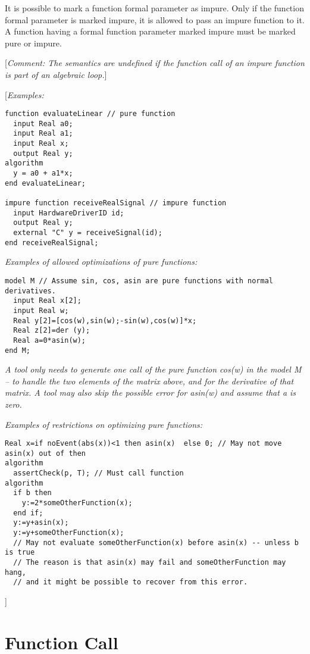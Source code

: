 It is possible to mark a function formal parameter as impure. Only if
the function formal parameter is marked impure, it is allowed to pass an
impure function to it. A function having a formal function parameter
marked impure must be marked pure or impure.

{[}\emph{Comment: The semantics are undefined if the function call of an
impure function is part of an algebraic loop.}{]}

{[}\emph{Examples:}

\begin{lstlisting}[language=modelica]
function evaluateLinear // pure function
  input Real a0;
  input Real a1;
  input Real x;
  output Real y;
algorithm
  y = a0 + a1*x;
end evaluateLinear;

impure function receiveRealSignal // impure function
  input HardwareDriverID id;
  output Real y;
  external "C" y = receiveSignal(id);
end receiveRealSignal;
\end{lstlisting}
\emph{Examples of allowed optimizations of pure functions:}

\begin{lstlisting}[language=modelica]
model M // Assume sin, cos, asin are pure functions with normal derivatives.
  input Real x[2];
  input Real w;
  Real y[2]=[cos(w),sin(w);-sin(w),cos(w)]*x;
  Real z[2]=der (y);
  Real a=0*asin(w);
end M;
\end{lstlisting}
\emph{A tool only needs to generate one call of the pure function cos(w)
in the model M -- to handle the two elements of the matrix above, and
for the derivative of that matrix. A tool may also skip the possible
error for asin(w) and assume that a is zero.}

\emph{Examples of restrictions on optimizing pure functions:}

\begin{lstlisting}[language=modelica]
  Real x=if noEvent(abs(x))<1 then asin(x)  else 0; // May not move asin(x) out of then
algorithm
  assertCheck(p, T); // Must call function
algorithm
  if b then
    y:=2*someOtherFunction(x);
  end if;
  y:=y+asin(x);
  y:=y+someOtherFunction(x);
  // May not evaluate someOtherFunction(x) before asin(x) -- unless b is true
  // The reason is that asin(x) may fail and someOtherFunction may hang,
  // and it might be possible to recover from this error.
\end{lstlisting}
{]}

\section{Function Call}


